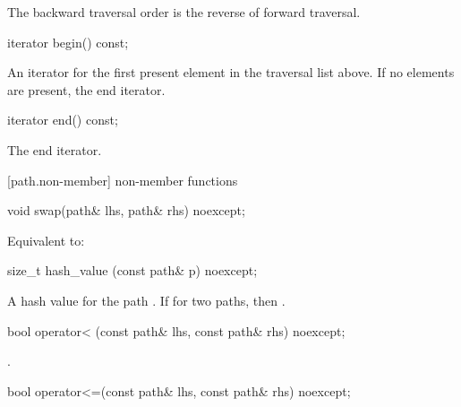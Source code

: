 \pnum
The backward traversal order is the reverse of forward traversal.

%
\begin{itemdecl}
iterator begin() const;
\end{itemdecl}

\begin{itemdescr}
\pnum
\returns An iterator for the first present element in the traversal
list above. If no elements are present, the end iterator.
\end{itemdescr}

%
\begin{itemdecl}
iterator end() const;
\end{itemdecl}

\begin{itemdescr}
\pnum
\returns The end iterator.
\end{itemdescr}

[path.non-member]{ non-member functions}

%
\begin{itemdecl}
void swap(path& lhs, path& rhs) noexcept;
\end{itemdecl}

\begin{itemdescr}
\pnum
\effects Equivalent to: 
\end{itemdescr}

%
\begin{itemdecl}
size_t hash_value (const path& p) noexcept;
\end{itemdecl}

\begin{itemdescr}
\pnum
\returns A hash value for the path . If
  for two paths,  then .
\end{itemdescr}

%
\begin{itemdecl}
bool operator< (const path& lhs, const path& rhs) noexcept;
\end{itemdecl}

\begin{itemdescr}
\pnum
\returns {}.
\end{itemdescr}

%
\begin{itemdecl}
bool operator<=(const path& lhs, const path& rhs) noexcept;
\end{itemdecl}

